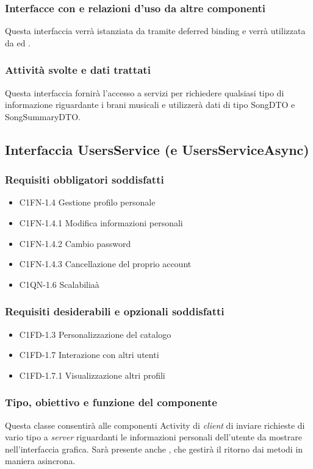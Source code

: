 \subsubsection*{Interfacce con e relazioni d'uso da altre componenti}
Questa interfaccia verr\`a istanziata da  tramite deferred
binding e verr\`a utilizzata da  ed .
\subsubsection*{Attivit\`a svolte e dati trattati}
Questa interfaccia fornir\`a l'accesso a servizi per richiedere qualsiasi tipo
di informazione riguardante i brani musicali e utilizzer\`a dati di tipo SongDTO
e SongSummaryDTO.

\subsection{Interfaccia UsersService (e UsersServiceAsync)}
\subsubsection*{Requisiti obbligatori soddisfatti}
\begin{itemize}
	\item C1FN-1.4 Gestione profilo personale
	\item C1FN-1.4.1 Modifica informazioni personali
	\item C1FN-1.4.2 Cambio password
	\item C1FN-1.4.3 Cancellazione del proprio account
    \item C1QN-1.6 Scalabilia\`a
\end{itemize}
\subsubsection*{Requisiti desiderabili e opzionali soddisfatti}
\begin{itemize}
    \item C1FD-1.3 Personalizzazione del catalogo
    \item C1FD-1.7 Interazione con altri utenti
    \item C1FD-1.7.1 Visualizzazione altri profili
\end{itemize}
\subsubsection*{Tipo, obiettivo e funzione del componente}
Questa classe consentir\`a alle componenti Activity di \emph{client} di inviare
richieste di vario tipo a \emph{server} riguardanti le informazioni personali
dell'utente da mostrare  nell'interfaccia grafica. Sar\`a presente anche
, che gestir\`a il ritorno dai metodi in maniera asincrona.
